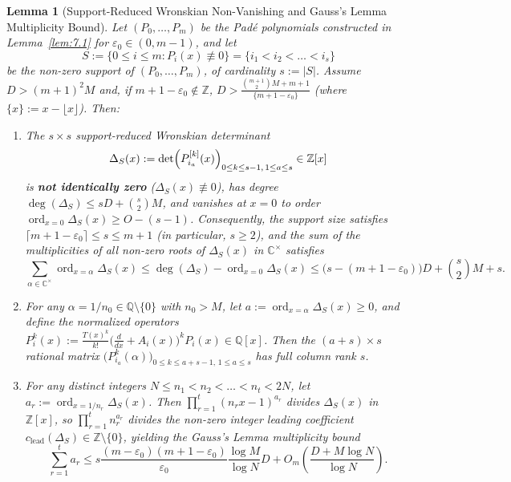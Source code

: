 \documentclass[11pt,reqno]{amsart}
\newtheorem{lemma}[theorem]{Lemma}
\theoremstyle{remark}
\numberwithin{equation}{section}
\newcommand{\Z}{\mathbb{Z}}
\newcommand{\Q}{\mathbb{Q}}
\newcommand{\C}{\mathbb{C}}
\DeclareMathOperator{\ord}{ord}
\begin{document}
\begin{lemma}[{Support-Reduced Wronskian Non-Vanishing and Gauss's Lemma Multiplicity Bound}]\label{lem:7.3}
Let $(P_0, \dots, P_m)$ be the Pad\'e polynomials constructed in Lemma~\ref{lem:7.1} for $\varepsilon_0 \in (0, m - 1)$, and let
\begin{equation}\label{eq:7.10}
S := \bigl\{0 \le i \le m : P_i(x) \not\equiv 0\bigr\} = \{i_1 < i_2 < \dots < i_s\}
\end{equation}
be the non-zero support of $(P_0, \dots, P_m)$, of cardinality $s := |S|$. Assume $D > (m + 1)^2 M$ and, if $m + 1 - \varepsilon_0 \notin \Z$, $D > \frac{\binom{m+1}{2}M + m + 1}{\{m + 1 - \varepsilon_0\}}$ (where $\{x\} := x - \lfloor x \rfloor$). Then:
\begin{enumerate}
\item[(i)] The $s \times s$ support-reduced Wronskian determinant
\begin{equation}\label{eq:7.11}
\Delta_S(x) := \det\Bigl(P_{i_a}^{[k]}(x)\Bigr)_{0 \le k \le s-1,\, 1 \le a \le s} \in \Z[x]
\end{equation}
is \textbf{not identically zero} ($\Delta_S(x) \not\equiv 0$), has degree $\deg(\Delta_S) \le sD + \binom{s}{2}M$, and vanishes at $x = 0$ to order $\ord_{x=0} \Delta_S(x) \ge O - (s - 1)$. Consequently, the support size satisfies $\lceil m + 1 - \varepsilon_0 \rceil \le s \le m + 1$ (in particular, $s \ge 2$), and the sum of the multiplicities of all non-zero roots of $\Delta_S(x)$ in $\C^\times$ satisfies
\begin{equation}\label{eq:7.12}
\sum_{\alpha \in \C^\times} \ord_{x=\alpha} \Delta_S(x) \le \deg(\Delta_S) - \ord_{x=0} \Delta_S(x) \le \bigl(s - (m + 1 - \varepsilon_0)\bigr)D + \binom{s}{2}M + s.
\end{equation}
\item[(ii)] For any $\alpha = 1/n_0 \in \Q \setminus \{0\}$ with $n_0 > M$, let $a := \ord_{x=\alpha} \Delta_S(x) \ge 0$, and define the normalized operators $P_i^k(x) := \frac{T(x)^k}{k!}\bigl(\frac{d}{dx} + A_i(x)\bigr)^k P_i(x) \in \Q[x]$. Then the $(a + s) \times s$ rational matrix $\bigl(P_{i_a}^k(\alpha)\bigr)_{0 \le k \le a+s-1,\, 1 \le a \le s}$ has full column rank $s$.
\item[(iii)] For any distinct integers $N \le n_1 < n_2 < \dots < n_t < 2N$, let $a_r := \ord_{x=1/n_r} \Delta_S(x)$. Then $\prod_{r=1}^t (n_r x - 1)^{a_r}$ divides $\Delta_S(x)$ in $\Z[x]$, so $\prod_{r=1}^t n_r^{a_r}$ divides the non-zero integer leading coefficient $c_{\mathrm{lead}}(\Delta_S) \in \Z \setminus \{0\}$, yielding the Gauss's Lemma multiplicity bound
\begin{equation}\label{eq:7.13}
\sum_{r=1}^t a_r \le s\frac{(m - \varepsilon_0)(m + 1 - \varepsilon_0)}{\varepsilon_0}\frac{\log M}{\log N}D + O_m\!\left(\frac{D + M\log N}{\log N}\right).
\end{equation}
\end{enumerate}
\end{lemma}
\end{document}
